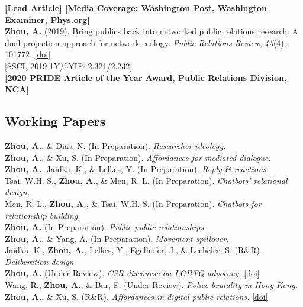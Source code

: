 \documentclass[12pt, letterpaper]{article}
\newcommand{\doi}[1]{\href{#1}{{[doi]}}}
\newcommand{\years}[1]{\marginnote{\normalsize #1}}
\begin{document}
  \years{} {\textbf{[Lead Article] [Media Coverage: \href{https://www.washingtonpost.com/politics/2019/09/17/twitter-got-somewhat-more-civil-when-tweets-doubled-length-heres-how-we-know}{Washington Post}, \href{https://www.washingtonexaminer.com/opinion/twitter-conversations-have-improved-but-theres-a-better-way-to-talk-to-each-other}{Washington Examiner}, \href{https://phys.org/news/2019-09-character-limit-twitter-civil.html}{Phys.org}]}\\
  \years{[1]} \textbf{Zhou, A.} (2019). Bring publics back into networked public relations research: A dual-projection approach for network ecology. \textit{Public Relations Review}, \textit{45}(4), 101772. \doi{https://doi.org/10.1016/j.pubrev.2019.03.004}\\
  \years{} {[SSCI, 2019 1Y/5YIF: 2.321/2.232]}\\
  \years{} {\textbf{[2020 PRIDE Article of the Year Award, Public Relations Division, NCA]}}

\subsection*{Working Papers}

\years{[11]} \textbf{Zhou, A.}, \& Dias, N. (In Preparation). \textit{Researcher ideology.}\\
\years{[10]} \textbf{Zhou, A.}, \& Xu, S. (In Preparation). \textit{Affordances for mediated dialogue.}\\
\years{[9]} \textbf{Zhou, A.}, Jaidka, K., \& Lelkes, Y. (In Preparation). \textit{Reply \& reactions.}\\
\years{[8]} Tsai, W.H. S., \textbf{Zhou, A.}, \&  Men, R. L. (In Preparation). \textit{Chatbots' relational design.}\\
\years{[7]} Men, R. L., \textbf{Zhou, A.}, \& Tsai, W.H. S. (In Preparation). \textit{Chatbots for relationship building.}\\
\years{[6]} \textbf{Zhou, A.} (In Preparation). \textit{Public-public relationships.}\\
\years{[5]} \textbf{Zhou, A.}, \& Yang, A. (In Preparation). \textit{Movement spillover.}\\
\years{[4]} Jaidka, K., \textbf{Zhou, A.}, Lelkes, Y., Egelhofer, J., \& Lecheler, S. (R\&R). \textit{Deliberation design.}\\
\years{[3]} \textbf{Zhou, A.} (Under Review). \textit{CSR discourse on LGBTQ advocacy.} \doi{https://doi.org/10.31219/osf.io/gz7bw}\\
\years{[2]} Wang, R., \textbf{Zhou, A.}, \& Bar, F. (Under Review). \textit{Police brutality in Hong Kong.}\\
\years{[1]} \textbf{Zhou, A.}, \& Xu, S. (R\&R). \textit{Affordances in digital public relations.} \doi{https://doi.org/10.31235/osf.io/uzhk9}

}
\end{document}
